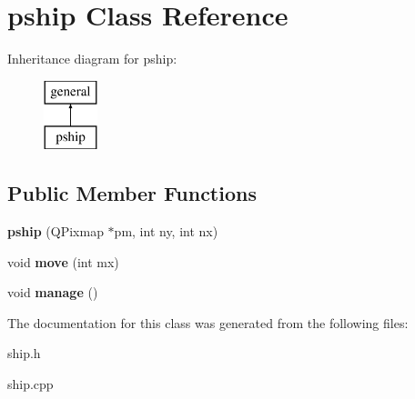 \hypertarget{classpship}{\section{pship \-Class \-Reference}
\label{classpship}
}
\-Inheritance diagram for pship\-:\begin{figure}[H]
\begin{center}
\leavevmode
\includegraphics[height=2.000000cm]{classpship}
\end{center}
\end{figure}
\subsection*{\-Public \-Member \-Functions}
\begin{DoxyCompactItemize}
\item 
\hypertarget{classpship_a1274b5708236cabcb4bd086383df5273}{{\bfseries pship} (\-Q\-Pixmap $\ast$pm, int ny, int nx)}\label{classpship_a1274b5708236cabcb4bd086383df5273}

\item 
\hypertarget{classpship_aafe1a18f9e6dac639a284c69a84ca4db}{void {\bfseries move} (int mx)}\label{classpship_aafe1a18f9e6dac639a284c69a84ca4db}

\item 
\hypertarget{classpship_a19f29dd54c0337af1cb4812e5212f713}{void {\bfseries manage} ()}\label{classpship_a19f29dd54c0337af1cb4812e5212f713}

\end{DoxyCompactItemize}


\-The documentation for this class was generated from the following files\-:\begin{DoxyCompactItemize}
\item 
ship.\-h\item 
ship.\-cpp\end{DoxyCompactItemize}

